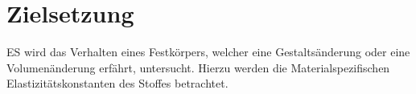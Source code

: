 
\section{Zielsetzung}
\label{sec:Zielsetzung}
ES wird das Verhalten eines Festkörpers, welcher eine Gestaltsänderung oder eine Volumenänderung erfährt, untersucht. Hierzu werden die Materialspezifischen Elastizitätskonstanten des Stoffes betrachtet. 
